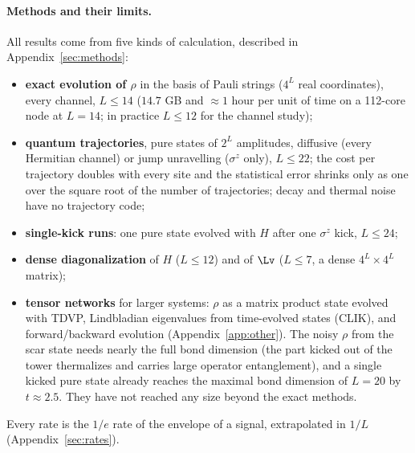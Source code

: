 \paragraph{Methods and their limits.} All results come from five kinds of calculation, described in Appendix~\ref{sec:methods}:
\begin{itemize}
\item \textbf{exact evolution of $\rho$} in the basis of Pauli strings ($4^L$ real coordinates), every channel, $L \le 14$ ($14.7$ GB and $\approx 1$ hour per unit of time on a 112-core node at $L = 14$; in practice $L \le 12$ for the channel study);
\item \textbf{quantum trajectories}, pure states of $2^L$ amplitudes, diffusive (every Hermitian channel) or jump unravelling ($\sigma^z$ only), $L \le 22$; the cost per trajectory doubles with every site and the statistical error shrinks only as one over the square root of the number of trajectories; decay and thermal noise have no trajectory code;
\item \textbf{single-kick runs}: one pure state evolved with $H$ after one $\sigma^z$ kick, $L \le 24$;
\item \textbf{dense diagonalization} of $H$ ($L \le 12$) and of $\Lv$ ($L \le 7$, a dense $4^L\times4^L$ matrix);
\item \textbf{tensor networks} for larger systems: $\rho$ as a matrix product state evolved with TDVP, Lindbladian eigenvalues from time-evolved states (CLIK), and forward/backward evolution (Appendix~\ref{app:other}). The noisy $\rho$ from the scar state needs nearly the full bond dimension (the part kicked out of the tower thermalizes and carries large operator entanglement), and a single kicked pure state already reaches the maximal bond dimension of $L = 20$ by $t \approx 2.5$. They have not reached any size beyond the exact methods.
\end{itemize}
Every rate is the $1/e$ rate of the envelope of a signal, extrapolated in $1/L$ (Appendix~\ref{sec:rates}).
